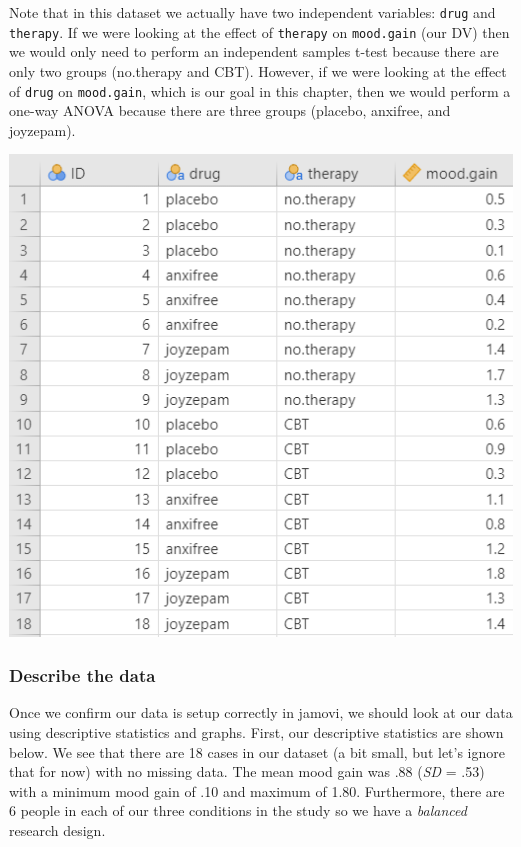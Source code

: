 \documentclass[
]{book}
\begin{document}
Note that in this dataset we actually have two independent variables: \texttt{drug} and \texttt{therapy}. If we were looking at the effect of \texttt{therapy} on \texttt{mood.gain} (our DV) then we would only need to perform an independent samples t-test because there are only two groups (no.therapy and CBT). However, if we were looking at the effect of \texttt{drug} on \texttt{mood.gain}, which is our goal in this chapter, then we would perform a one-way ANOVA because there are three groups (placebo, anxifree, and joyzepam).

\includegraphics{images/04_one-way-anova/anova_data.png}

\hypertarget{describe-the-data-4}{%
\subsubsection{Describe the data}\label{describe-the-data-4}}

Once we confirm our data is setup correctly in jamovi, we should look at our data using descriptive statistics and graphs. First, our descriptive statistics are shown below. We see that there are 18 cases in our dataset (a bit small, but let's ignore that for now) with no missing data. The mean mood gain was .88 (\emph{SD} = .53) with a minimum mood gain of .10 and maximum of 1.80. Furthermore, there are 6 people in each of our three conditions in the study so we have a \emph{balanced} research design.
\end{document}
